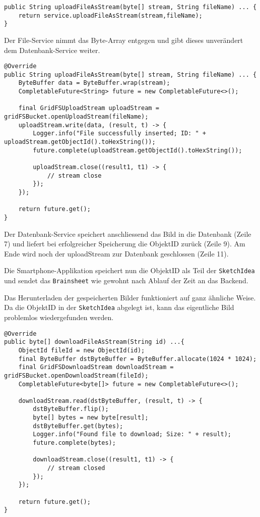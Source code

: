 \begin{lstlisting}[caption={Upload File im File Service}, label=uploadFileService]
public String uploadFileAsStream(byte[] stream, String fileName) ... {
    return service.uploadFileAsStream(stream,fileName);
}
\end{lstlisting}

Der File-Service nimmt das Byte-Array entgegen und gibt dieses unverändert dem Datenbank-Service weiter.

\begin{lstlisting}[caption={Upload File im DB Service}, label=uploadFileDBService]
@Override
public String uploadFileAsStream(byte[] stream, String fileName) ... {
    ByteBuffer data = ByteBuffer.wrap(stream);
    CompletableFuture<String> future = new CompletableFuture<>();

    final GridFSUploadStream uploadStream = gridFSBucket.openUploadStream(fileName);
    uploadStream.write(data, (result, t) -> {
        Logger.info("File successfully inserted; ID: " + uploadStream.getObjectId().toHexString());
        future.complete(uploadStream.getObjectId().toHexString());

        uploadStream.close((result1, t1) -> {
            // stream close
        });
    });

    return future.get();
}
\end{lstlisting}

Der Datenbank-Service speichert anschliessend das Bild in die Datenbank (Zeile 7) und liefert bei erfolgreicher Speicherung die ObjektID zurück (Zeile 9). Am Ende wird noch der uploadStream zur Datenbank geschlossen (Zeile 11).

Die Smartphone-Applikation speichert nun die ObjektID als Teil der \texttt{SketchIdea} und sendet das \texttt{Brainsheet} wie gewohnt nach Ablauf der Zeit an das Backend.

Das Herunterladen der gespeicherten Bilder funktioniert auf ganz ähnliche Weise. Da die ObjektID in der \texttt{SketchIdea} abgelegt ist, kann das eigentliche Bild problemlos wiedergefunden werden.

\begin{lstlisting}[caption={Download File im DB Service}, label=uploadFileDBService]
@Override
public byte[] downloadFileAsStream(String id) ...{
    ObjectId fileId = new ObjectId(id);
    final ByteBuffer dstByteBuffer = ByteBuffer.allocate(1024 * 1024);
    final GridFSDownloadStream downloadStream = gridFSBucket.openDownloadStream(fileId);
    CompletableFuture<byte[]> future = new CompletableFuture<>();

    downloadStream.read(dstByteBuffer, (result, t) -> {
        dstByteBuffer.flip();
        byte[] bytes = new byte[result];
        dstByteBuffer.get(bytes);
        Logger.info("Found file to download; Size: " + result);
        future.complete(bytes);

        downloadStream.close((result1, t1) -> {
            // stream closed
        });
    });

    return future.get();
}
\end{lstlisting}

